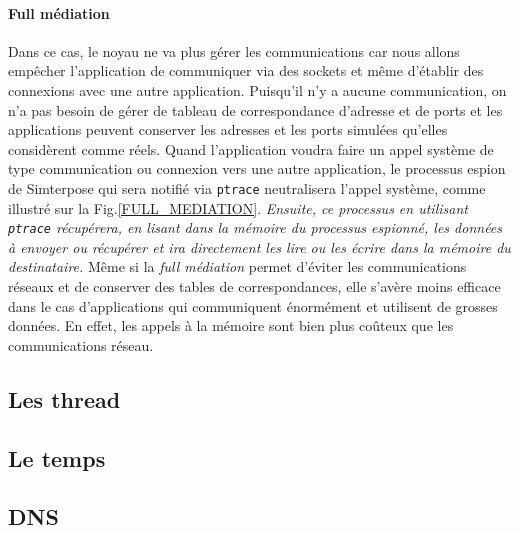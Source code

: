 \paragraph{Full médiation} 
Dans ce cas, le noyau ne va plus gérer les communications car nous allons
empêcher l'application de communiquer via des sockets et même d'établir des
connexions avec une autre application. Puisqu'il n'y a aucune communication, on
n'a pas besoin de gérer de tableau de correspondance d'adresse et de ports et
les applications peuvent conserver les adresses et les ports simulées qu'elles
considèrent comme réels. Quand l'application voudra faire un appel système de
type communication ou connexion vers une autre application, le processus espion
de Simterpose qui sera notifié via \texttt{ptrace} neutralisera l'appel système,
comme illustré sur la Fig.\ref{FULL_MEDIATION}. \textit{Ensuite, ce processus en
  utilisant \texttt{ptrace} récupérera, en lisant dans la mémoire du processus
  espionné, les données à envoyer ou récupérer et ira directement les lire ou
  les écrire dans la mémoire du destinataire.}  Même si la \textit{full
  médiation} permet d'éviter les communications réseaux et de conserver des
tables de correspondances, elle s'avère moins efficace dans le cas
d'applications qui communiquent énormément et utilisent de grosses données. En
effet, les appels à la mémoire sont bien plus coûteux que les communications
réseau.

 

\subsection{Les thread}

\subsection{Le temps}

\subsection{DNS}
